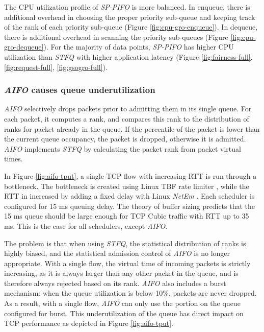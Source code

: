 The CPU utilization profile of \textit{SP-PIFO} is more balanced. In enqueue,
there is additional overhead in choosing the proper priority sub-queue
and keeping track of the rank of each priority sub-queue (Figure
\ref{fig:cpu-gro-enqueue}). In dequeue, there is additional overhead
in scanning the priority sub-queues (Figure 
\ref{fig:cpu-gro-dequeue}). 
For the majority of data points, \textit{SP-PIFO} has higher CPU
utilization than \textit{STFQ} with higher application latency (Figure 
\ref{fig:fairness-full},
\ref{fig:request-full}, \ref{fig:gsogro-full}).

\subsubsection{\textit{AIFO} causes queue underutilization}
\label{app:aifo-qlen}




\textit{AIFO} selectively drops packets prior to admitting them in its single
queue. For each packet, it computes a rank, and compares this rank to
the distribution of ranks for packet already in the queue. If the
percentile of the packet is lower than the current queue occupancy,
the packet is dropped, otherwise it is admitted. \textit{AIFO} implements
\textit{STFQ} by calculating the packet rank from packet virtual times.

In Figure \ref{fig:aifo-tput}, a single TCP flow with increasing RTT is
run through a bottleneck. The bottleneck is created using Linux
TBF rate limiter \cite{sch-tbf}, while the RTT in increased by adding
a fixed delay with Linux \textit{NetEm} \cite{sch-netem}. Each scheduler is
configured for 15 ms queuing delay. The theory of buffer sizing
\cite{sch-netem} predicts that the 15 ms queue should be large enough
for TCP Cubic traffic with RTT up to 35 ms. This is the case for all
schedulers, except \textit{AIFO}.



The problem is that when using \textit{STFQ}, the statistical distribution of
ranks is highly biased, and the statistical admission control of \textit{AIFO}
is no longer appropriate. With a single flow, the virtual time of
incoming packets is strictly increasing, as it is always larger than any other
packet in the queue, and is therefore always rejected based on its 
rank. \textit{AIFO} also includes a burst mechanism: when the queue utilization is below 10\%, packets are never dropped. As a result, with a single flow, \textit{AIFO}
can only use the portion on the queue configured for burst. This
underutilization of the queue has direct impact on TCP performance as depicted in Figure \ref{fig:aifo-tput}.

